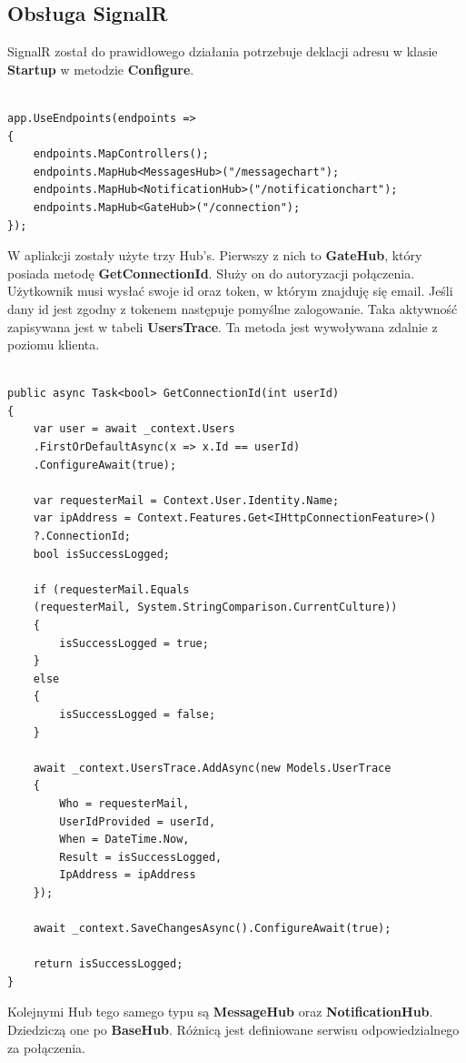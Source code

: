 \documentclass[12pt,a4paper]{article}
\begin{document}
\subsection{Obsługa SignalR}
\hspace*{0.7cm} SignalR został do prawidłowego działania potrzebuje deklacji adresu w klasie \textbf{Startup} w metodzie \textbf{Configure}.

\begin{lstlisting}[caption={Konfiguracja SignalR}]

app.UseEndpoints(endpoints =>
{
	endpoints.MapControllers();
	endpoints.MapHub<MessagesHub>("/messagechart");
	endpoints.MapHub<NotificationHub>("/notificationchart");
	endpoints.MapHub<GateHub>("/connection");
});
\end{lstlisting}

W apliakcji zostały użyte trzy Hub's.\newline
Pierwszy z nich to \textbf{GateHub}, który posiada metodę \textbf{GetConnectionId}. Służy on do autoryzacji połączenia. Użytkownik musi wysłać swoje id oraz token, w którym znajduję się email. Jeśli dany id jest zgodny z tokenem następuje pomyślne zalogowanie. Taka aktywność zapisywana jest w tabeli \textbf{UsersTrace}. Ta metoda jest wywoływana zdalnie z poziomu klienta.

\begin{lstlisting}[caption={Implementacja metody GetConnectionId z klasy GateHub}]

public async Task<bool> GetConnectionId(int userId)
{
	var user = await _context.Users
	.FirstOrDefaultAsync(x => x.Id == userId)
	.ConfigureAwait(true);
	
	var requesterMail = Context.User.Identity.Name;
	var ipAddress = Context.Features.Get<IHttpConnectionFeature>()
	?.ConnectionId;
	bool isSuccessLogged;
	
	if (requesterMail.Equals
	(requesterMail, System.StringComparison.CurrentCulture))
	{
		isSuccessLogged = true;
	}
	else
	{
		isSuccessLogged = false;
	}
	
	await _context.UsersTrace.AddAsync(new Models.UserTrace
	{
		Who = requesterMail,
		UserIdProvided = userId,
		When = DateTime.Now,
		Result = isSuccessLogged,
		IpAddress = ipAddress
	});

	await _context.SaveChangesAsync().ConfigureAwait(true);
	
	return isSuccessLogged;
}
\end{lstlisting}

Kolejnymi Hub tego samego typu są \textbf{MessageHub} oraz \textbf{NotificationHub}. Dziedziczą one po \textbf{BaseHub}. Różnicą jest definiowane serwisu odpowiedzialnego za połączenia.
\end{document}
